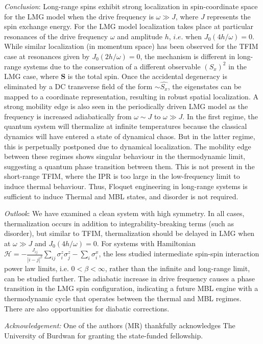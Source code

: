 \documentclass[%
reprint,
superscriptaddress,
amsmath,amssymb,
aps,
prb,
]{revtex4-2}
\begin{document}
	\emph{Conclusion}: Long-range spins exhibit strong localization in spin-coordinate space for the LMG model when the drive frequency is $\omega \gg J$, where $J$ represents the spin exchange energy. For the LMG model localization takes place at particular resonances of the drive frequency $\omega$ and amplitude $h$, $\textit{i.e.}$ when $J_0(4h/\omega)=0$. While similar localization (in momentum space) has been observed for the TFIM case at resonances given by $J_0(2h/\omega)=0$, the mechanism is different in long-range systems due to the conservation of a different observable $(S_x)^2$ in the LMG case, where $\mathbf{S}$ is the total spin. Once the accidental degeneracy is eliminated by a DC transverse field of the form $\sim \hat{S_x}$, the eigenstates can be mapped to a coordinate representation, resulting in robust spatial localization. A strong mobility edge is also seen in the periodically driven LMG model as the frequency is increased adiabatically from $\omega \sim J$ to $\omega \gg J$.
	In the first regime, the quantum system will thermalize at infinite temperatures because the classical dynamics will have entered a state of dynamical chaos.
	But in the latter regime, this is perpetually postponed due to dynamical localization. The mobility edge between these regimes shows singular behaviour in the thermodynamic limit, suggesting a quantum phase transition between them. This is not present in the short-range TFIM, where the IPR is too large in the low-frequency limit to induce thermal behaviour. Thus, Floquet engineering in long-range systems is sufficient to induce Thermal and MBL states, and disorder is not required.
	
	\emph{Outlook}: 
	We have examined a clean system with high symmetry. In all cases, thermalization occurs in addition to integrability-breaking terms (such as disorder), but similar to TFIM, thermalization should be delayed in LMG when at $\omega\gg J$ and $J_0(4h/\omega) = 0$. For systems with Hamiltonian $\mathcal{H} = -\frac{J_{ij}}{|i-j|^\beta} \sum_{ij}\sigma^z_i\sigma^z_j -\sum_i \sigma^x_i$, the less studied intermediate spin-spin interaction power law limits, i.e. $0<\beta<\infty$, rather than the infinite and long-range limit, can be studied further. The adiabatic increase in drive frequency causes a phase transition in the LMG spin configuration, indicating a future MBL engine with a thermodynamic cycle that operates between the thermal and MBL regimes. There are also opportunities for diabatic corrections. 
	
	
	
	{\it Acknowledgement:}
	One of the authors (MR) thankfully acknowledges The University of Burdwan for granting the state-funded fellowship.
	
	
	
	\nocite{*}
	
	
\end{document}
